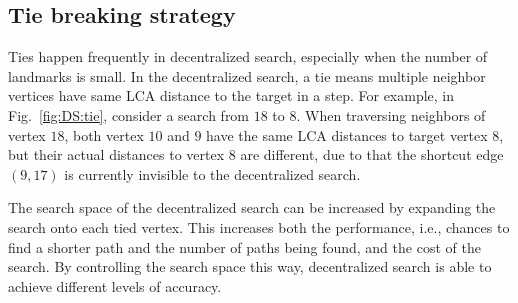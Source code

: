 \subsection{Tie breaking strategy}

Ties happen frequently in decentralized search, especially when the number of landmarks is small. In the decentralized search, a tie means multiple neighbor vertices have same LCA distance to the target in a step. 
For example, in Fig.~\ref{fig:DS:tie}, consider a search from $18$ to $8$. When traversing neighbors of vertex $18$, both vertex $10$ and $9$ have the same LCA distances to target vertex $8$, but their actual distances to vertex $8$ are different, due to that the shortcut edge $(9, 17)$ is currently invisible to the decentralized search.

The search space of the decentralized search can be increased by expanding the search onto each tied vertex. This increases both the performance, i.e., chances to find a shorter path and the number of paths being found, and the cost of the search. By controlling the search space this way, decentralized search is able to achieve different levels of accuracy.


